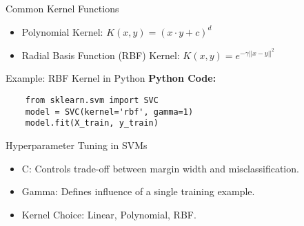 \documentclass[11pt]{beamer}
\begin{document}
\begin{frame}{Common Kernel Functions}
    \begin{itemize}
        \item Polynomial Kernel: $ K(x, y) = (x \cdot y + c)^d $
        \item Radial Basis Function (RBF) Kernel: $ K(x, y) = e^{-\gamma ||x - y||^2} $
    \end{itemize}
\end{frame}

\begin{frame}[fragile]{Example: RBF Kernel in Python}
    \textbf{Python Code:}
    \begin{verbatim}
    from sklearn.svm import SVC
    model = SVC(kernel='rbf', gamma=1)
    model.fit(X_train, y_train)
    \end{verbatim}
\end{frame}

\begin{frame}{Hyperparameter Tuning in SVMs}
    \begin{itemize}
        \item C: Controls trade-off between margin width and misclassification.
        \item Gamma: Defines influence of a single training example.
        \item Kernel Choice: Linear, Polynomial, RBF.
    \end{itemize}
\end{frame}
\end{document}
